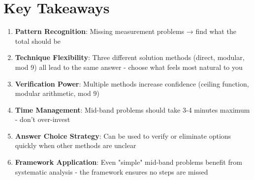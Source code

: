 \documentclass[]{article}
\begin{document}
\section*{Key Takeaways}
\begin{enumerate}[leftmargin=*]
    \item \textbf{Pattern Recognition}: Missing measurement problems → find what the total should be
    \item \textbf{Technique Flexibility}: Three different solution methods (direct, modular, mod 9) all lead to the same answer - choose what feels most natural to you
    \item \textbf{Verification Power}: Multiple methods increase confidence (ceiling function, modular arithmetic, mod 9)
    \item \textbf{Time Management}: Mid-band problems should take 3-4 minutes maximum - don't over-invest
    \item \textbf{Answer Choice Strategy}: Can be used to verify or eliminate options quickly when other methods are unclear
    \item \textbf{Framework Application}: Even "simple" mid-band problems benefit from systematic analysis - the framework ensures no steps are missed
\end{enumerate}
\end{document}
